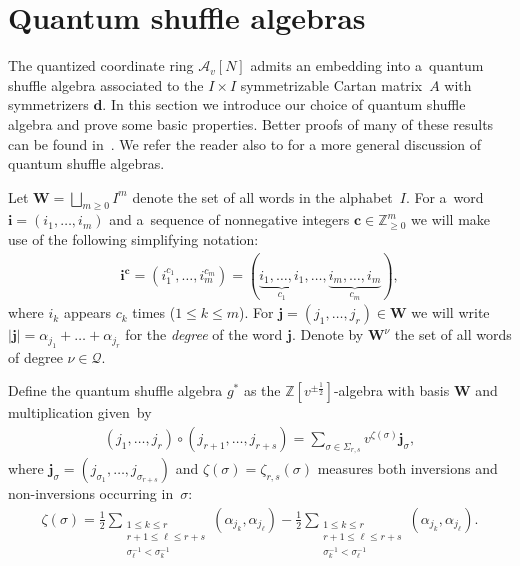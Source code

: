 \section{Quantum shuf\/f\/le algebras}\label{sec:shuffle}

The quantized coordinate ring $\mathcal{A}_v[N]$ admits an embedding into a~quantum shuf\/f\/le algebra associated to the
$I\times I$ symmetrizable Cartan matrix~$A$ with symmetrizers $\mathbf{d}$.
In this section we introduce our choice of quantum shuf\/f\/le algebra and prove some basic properties.
Better proofs of many of these results can be found in~\cite{leclerc}.
We refer the reader also to \cite{Rosso} for a more general discussion of quantum shuf\/f\/le algebras.


Let $\mathbf{W}=\bigsqcup\limits_{m\ge0} I^m$ denote the set of all words in the alphabet~$I$.
For a~word $\mathbf{i}=(i_1,\ldots,i_m)$ and a~sequence of nonnegative integers $\mathbf{c}\in\mathbb{Z}_{\ge0}^m$ we
will make use of the following simplifying notation:
\begin{gather*}
\mathbf{i}^\mathbf{c}=(i_1^{c_1},\ldots,i_m^{c_m})=(\underbrace{i_1,\ldots,
i_1}_{c_1},\ldots,\underbrace{i_m,\ldots,i_m}_{c_m}),
\end{gather*}
where $i_k$ appears $c_k$ times ($1\le k\le m$).
For $\mathbf{j}=(j_1,\ldots,j_r)\in\mathbf{W}$ we will write $|\mathbf{j}|=\alpha_{j_1}+\dots+\alpha_{j_r}$ for the
\emph{degree} of the word $\mathbf{j}$.
Denote by $\mathbf{W}^\nu$ the set of all words of degree $\nu\in\mathcal{Q}$.

Def\/ine the quantum shuf\/f\/le algebra $g^*$ as the $\mathbb{Z}[v^{\pm\frac{1}{2}}]$-algebra with basis $\mathbf{W}$ and
multiplication given~by
\begin{gather}
\label{eq:shuffle_product}
(j_1,\ldots,j_r)\circ(j_{r+1},\ldots,j_{r+s})=\sum\limits_{\sigma\in\Sigma_{r,s}}v^{\zeta(\sigma)}\mathbf{j}_\sigma,
\end{gather}
where $\mathbf{j}_\sigma=(j_{\sigma_1},\ldots,j_{\sigma_{r+s}})$ and $\zeta(\sigma)=\zeta_{r,s}(\sigma)$ measures both
inversions and non-inversions occurring in~$\sigma$:
\begin{gather*}
\zeta(\sigma)=\frac{1}{2}\sum\limits_{\substack{1\le k\le r
\\
r+1\le \ell\le r+s
\\
\sigma^{-1}_\ell<\sigma^{-1}_k}}(\alpha_{j_k},\alpha_{j_\ell})-\frac{1}{2}\sum\limits_{\substack{1\le k\le r
\\
r+1\le \ell\le r+s
\\
\sigma^{-1}_k<\sigma^{-1}_\ell}}(\alpha_{j_k},\alpha_{j_\ell}).
\end{gather*}

